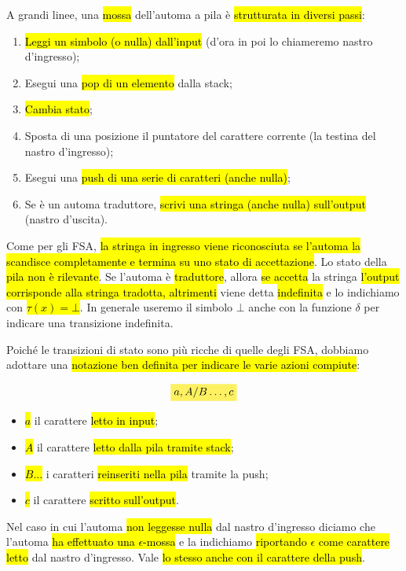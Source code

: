 \documentclass[a4paper,11pt,twoside]{article}
\theoremstyle{plain}
\theoremstyle{definition}
\theoremstyle{remark}
\newcommand{\mhl}[1]{\colorbox{hlcolor}{$\displaystyle #1$}}
\begin{document}
A grandi linee, una \hl{mossa} dell'automa a pila è \hl{strutturata in diversi
passi}:

\begin{enumerate}
  \item \hl{Leggi un simbolo (o nulla) dall'input} (d'ora in poi lo chiameremo
    nastro d'ingresso);
  \item Esegui una \hl{pop di un elemento} dalla stack;
  \item \hl{Cambia stato};
  \item Sposta di una posizione il puntatore del carattere corrente (la testina
    del nastro d'ingresso);
  \item Esegui una \hl{push di una serie di caratteri (anche nulla)};
  \item Se è un automa traduttore, \hl{scrivi una stringa (anche nulla)
    sull'output} (nastro d'uscita).
\end{enumerate}

Come per gli FSA, \hl{la stringa in ingresso viene riconosciuta se l'automa la
scandisce completamente e termina su uno stato di accettazione}. Lo stato della
\hl{pila non è rilevante}. Se l'automa è \hl{traduttore}, allora \hl{se accetta}
la stringa \hl{l'output corrisponde alla stringa tradotta, altrimenti} viene
detta \hl{indefinita} e lo indichiamo con \hl{$\tau(x) = \bot$}. In generale
useremo il simbolo $\bot$ anche con la funzione $\delta$ per indicare una
transizione indefinita.

Poiché le transizioni di stato sono più ricche di quelle degli FSA, dobbiamo
adottare una \hl{notazione ben definita per indicare le varie azioni compiute}:

\begin{equation}
  \mhl{a, A / B\ldots, c}
\end{equation}

\begin{itemize}
  \item \hl{$a$} il carattere \hl{letto in input};
  \item \hl{$A$} il carattere \hl{letto dalla pila tramite stack};
  \item \hl{$B\ldots$} i caratteri \hl{reinseriti nella pila} tramite la push;
  \item \hl{$c$} il carattere \hl{scritto sull'output}.
\end{itemize}

Nel caso in cui l'automa \hl{non leggesse nulla} dal nastro d'ingresso diciamo
che l'automa \hl{ha effettuato una $\epsilon$-mossa} e la indichiamo
\hl{riportando $\epsilon$ come carattere letto} dal nastro d'ingresso. Vale
\hl{lo stesso anche con il carattere della push}.
\end{document}
